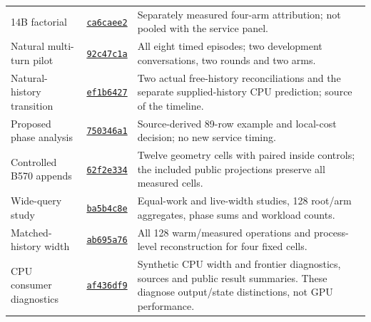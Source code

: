 \begin{longtable}{@{}p{3.2cm}p{2.35cm}p{10.0cm}@{}}
14B factorial & \href{https://github.com/leecdiang/HeteroSpec/tree/ca6caee2cb1cd21dbcfcf1312e500a8fbb3729a8/benchmarks/server_expansion_v1/D14/results_attribution_20261108}{\texttt{ca6caee2}} & Separately measured four-arm attribution; not pooled with the service panel.\\
Natural multi-turn pilot & \href{https://github.com/leecdiang/HeteroSpec/blob/92c47c1a49243fdb871036ff39ac33babddec04b/benchmarks/server_expansion_v1/N/free_service_retry_20261113/EVIDENCE/EPISODES.json}{\texttt{92c47c1a}} & All eight timed episodes; two development conversations, two rounds and two arms.\\
Natural-history transition & \href{https://github.com/leecdiang/HeteroSpec/blob/ef1b6427b7f3b6b7d62c4249933b33b8f810d89f/benchmarks/server_expansion_v1/N/resident_opportunity_20261113/RESULTS/REPORT.json}{\texttt{ef1b6427}} & Two actual free-history reconciliations and the separate supplied-history CPU prediction; source of the timeline.\\
Proposed phase analysis & \href{https://github.com/leecdiang/HeteroSpec/tree/750346a149da58aa94a0d16016f5c451221008f7/benchmarks/server_expansion_v1/N/local_cost_decision_20261113}{\texttt{750346a1}} & Source-derived 89-row example and local-cost decision; no new service timing.\\
Controlled B570 appends & \href{https://github.com/leecdiang/HeteroSpec/blob/62f2e3345b25b59268cc2b3c131fd5ed8c7d5f88/platforms/b570_snapshot/benchmarks/tpds_phase1_v1/RESULT.md}{\texttt{62f2e334}} & Twelve geometry cells with paired inside controls; the included public projections preserve all measured cells.\\
Wide-query study & \href{https://github.com/leecdiang/HeteroSpec/tree/ba5b4c8e01d50d4bfaab1ac3908f798347be063a}{\texttt{ba5b4c8e}} & Equal-work and live-width studies, 128 root/arm aggregates, phase sums and workload counts.\\
Matched-history width & \href{https://github.com/leecdiang/HeteroSpec/tree/ab695a766d055f7d3c6b1fed0720c579c749bcdb/benchmarks/server_expansion_v1/strong_baseline_followup_20261110/RESULTS_B2_20261110}{\texttt{ab695a76}} & All 128 warm/measured operations and process-level reconstruction for four fixed cells.\\
CPU consumer diagnostics & \href{https://github.com/leecdiang/HeteroSpec/tree/af436df989570ad882db65bd8a4b265b9e8cfdae/benchmarks/frontier_cost_v1}{\texttt{af436df9}} & Synthetic CPU width and frontier diagnostics, sources and public result summaries. These diagnose output/state distinctions, not GPU performance.\\

\end{longtable}
